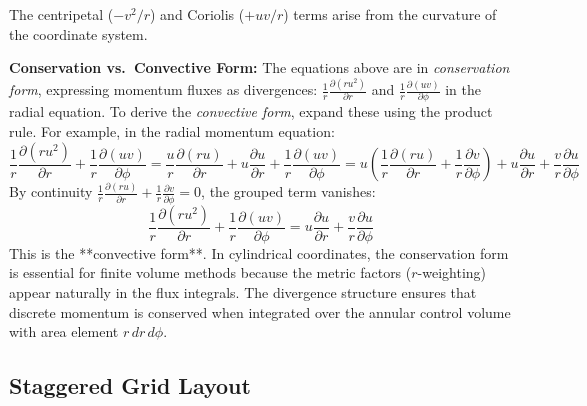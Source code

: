 The centripetal ($-v^2/r$) and Coriolis ($+uv/r$) terms arise from the curvature of the coordinate system.

\textbf{Conservation vs.\ Convective Form:}
The equations above are in \emph{conservation form}, expressing momentum fluxes as divergences: $\frac{1}{r}\frac{\partial(ru^2)}{\partial r}$ and $\frac{1}{r}\frac{\partial(uv)}{\partial\phi}$ in the radial equation. To derive the \emph{convective form}, expand these using the product rule. For example, in the radial momentum equation:
\begin{equation}
    \frac{1}{r}\frac{\partial(ru^2)}{\partial r} + \frac{1}{r}\frac{\partial(uv)}{\partial\phi}
    = \frac{u}{r}\frac{\partial(ru)}{\partial r} + u\frac{\partial u}{\partial r} + \frac{1}{r}\frac{\partial(uv)}{\partial\phi}
    = u\left(\frac{1}{r}\frac{\partial(ru)}{\partial r} + \frac{1}{r}\frac{\partial v}{\partial\phi}\right) + u\frac{\partial u}{\partial r} + \frac{v}{r}\frac{\partial u}{\partial\phi}
\end{equation}
By continuity $\frac{1}{r}\frac{\partial(ru)}{\partial r} + \frac{1}{r}\frac{\partial v}{\partial\phi} = 0$, the grouped term vanishes:
\begin{equation}
    \frac{1}{r}\frac{\partial(ru^2)}{\partial r} + \frac{1}{r}\frac{\partial(uv)}{\partial\phi} = u\frac{\partial u}{\partial r} + \frac{v}{r}\frac{\partial u}{\partial\phi}
\end{equation}
This is the **convective form**. In cylindrical coordinates, the conservation form is essential for finite volume methods because the metric factors ($r$-weighting) appear naturally in the flux integrals. The divergence structure ensures that discrete momentum is conserved when integrated over the annular control volume with area element $r\,dr\,d\phi$.

\subsection{Staggered Grid Layout}

